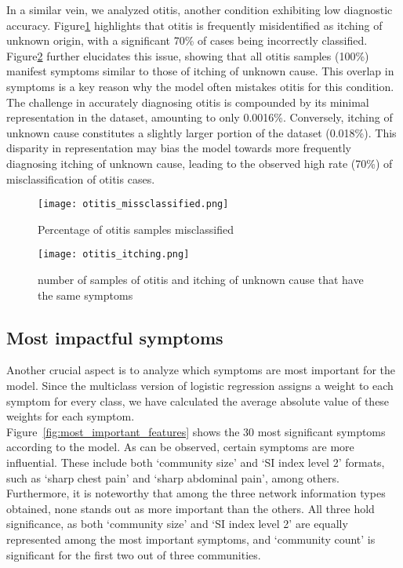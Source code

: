 In a similar vein, we analyzed otitis, another condition exhibiting low diagnostic accuracy.
Figure\ref{fig:otitis_missclassified} highlights that otitis is frequently misidentified as itching of unknown origin,
with a significant 70\% of cases being incorrectly classified.\\
Figure\ref{fig:otitis_itching} further elucidates this issue,
showing that all otitis samples (100\%) manifest symptoms similar to those of itching of unknown cause.
This overlap in symptoms is a key reason why the model often mistakes otitis for this condition.\\
The challenge in accurately diagnosing otitis is compounded by its minimal representation in the dataset, amounting to only 0.0016\%.
Conversely, itching of unknown cause constitutes a slightly larger portion of the dataset (0.018\%).
This disparity in representation may bias the model towards more frequently diagnosing itching of unknown cause,
leading to the observed high rate (70\%) of misclassification of otitis cases.
\begin{figure}[h]
	\centering
	\texttt{[image: otitis\_missclassified.png]}
	\caption{Percentage of otitis samples misclassified}\label{fig:otitis_missclassified}
\end{figure}
\noindent
\begin{figure}[h]
	\centering
	\texttt{[image: otitis\_itching.png]}
	\caption{number of samples of otitis and itching of unknown cause that have the same symptoms}\label{fig:otitis_itching}
\end{figure}
\noindent

\subsection*{Most impactful symptoms}
Another crucial aspect is to analyze which symptoms are most important for the model.
Since the multiclass version of logistic regression assigns a weight to each symptom for every class,
we have calculated the average absolute value of these weights for each symptom.\\
Figure~\ref{fig:most_important_features} shows the 30 most significant symptoms according to the model.
As can be observed, certain symptoms are more influential. These include both `community size' and `SI index level 2' formats,
such as `sharp chest pain' and `sharp abdominal pain', among others.\\
Furthermore, it is noteworthy that among the three network information types obtained,
none stands out as more important than the others. All three hold significance,
as both `community size' and `SI index level 2' are equally represented among the most important symptoms,
and `community count' is significant for the first two out of three communities.

